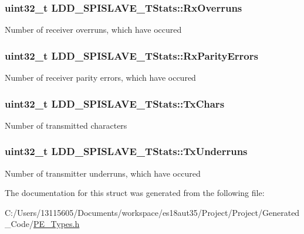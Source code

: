 \subsubsection[{Rx\+Overruns}]{\setlength{\rightskip}{0pt plus 5cm}uint32\+\_\+t L\+D\+D\+\_\+\+S\+P\+I\+S\+L\+A\+V\+E\+\_\+\+T\+Stats\+::\+Rx\+Overruns}\label{struct_l_d_d___s_p_i_s_l_a_v_e___t_stats_a82edd5dc5e18e7cd6a047d0efbda97ae}
Number of receiver overruns, which have occured \hypertarget{struct_l_d_d___s_p_i_s_l_a_v_e___t_stats_abef442625b92cf52c2ff04edf6894dd3}{}
\subsubsection[{Rx\+Parity\+Errors}]{\setlength{\rightskip}{0pt plus 5cm}uint32\+\_\+t L\+D\+D\+\_\+\+S\+P\+I\+S\+L\+A\+V\+E\+\_\+\+T\+Stats\+::\+Rx\+Parity\+Errors}\label{struct_l_d_d___s_p_i_s_l_a_v_e___t_stats_abef442625b92cf52c2ff04edf6894dd3}
Number of receiver parity errors, which have occured \hypertarget{struct_l_d_d___s_p_i_s_l_a_v_e___t_stats_ab674ba50318e198a1ee9dea0692ce239}{}
\subsubsection[{Tx\+Chars}]{\setlength{\rightskip}{0pt plus 5cm}uint32\+\_\+t L\+D\+D\+\_\+\+S\+P\+I\+S\+L\+A\+V\+E\+\_\+\+T\+Stats\+::\+Tx\+Chars}\label{struct_l_d_d___s_p_i_s_l_a_v_e___t_stats_ab674ba50318e198a1ee9dea0692ce239}
Number of transmitted characters \hypertarget{struct_l_d_d___s_p_i_s_l_a_v_e___t_stats_ab2e5342f4a486b20ae9306f451451a77}{}
\subsubsection[{Tx\+Underruns}]{\setlength{\rightskip}{0pt plus 5cm}uint32\+\_\+t L\+D\+D\+\_\+\+S\+P\+I\+S\+L\+A\+V\+E\+\_\+\+T\+Stats\+::\+Tx\+Underruns}\label{struct_l_d_d___s_p_i_s_l_a_v_e___t_stats_ab2e5342f4a486b20ae9306f451451a77}
Number of transmitter underruns, which have occured 

The documentation for this struct was generated from the following file\+:\begin{DoxyCompactItemize}
\item 
C\+:/\+Users/13115605/\+Documents/workspace/es18aut35/\+Project/\+Project/\+Generated\+\_\+\+Code/\hyperlink{_p_e___types_8h}{P\+E\+\_\+\+Types.\+h}\end{DoxyCompactItemize}
